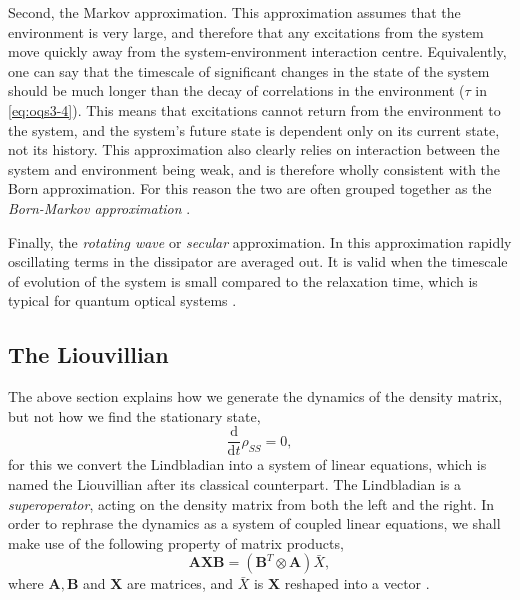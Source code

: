 Second, the Markov approximation. This approximation assumes that the environment is very large, and therefore that any excitations from the system move quickly away from the system-environment interaction centre. Equivalently, one can say that the timescale of significant changes in the state of the system should be much longer than the decay of correlations in the environment (\(\tau\) in \cref{eq:oqs3-4}). This means that excitations cannot return from the environment to the system, and the system's future state is dependent only on its current state, not its history. This approximation also clearly relies on interaction between the system and environment being weak, and is therefore wholly consistent with the Born approximation. For this reason the two are often grouped together as the \emph{Born-Markov approximation} \cite{Hartmann_BM,BP_BMS}.

Finally, the \emph{rotating wave} or \emph{secular} approximation. In this approximation rapidly oscillating terms in the dissipator are averaged out. It is valid when the timescale of evolution of the system is small compared to the relaxation time, which is typical for quantum optical systems \cite{BP_BMS}.

\subsection{The Liouvillian}
The above section explains how we generate the dynamics of the density matrix, but not how we find the stationary state,
\begin{equation}
	\frac{\mathrm{d}}{\mathrm{d}t}\rho_{SS} = 0,
	\label{eq:oqs4-1}
\end{equation}
for this we convert the Lindbladian into a system of linear equations, which is named the Liouvillian after its classical counterpart. The Lindbladian is a \emph{superoperator}, acting on the density matrix from both the left and the right. In order to rephrase the dynamics as a system of coupled linear equations, we shall make use of the following property of matrix products,
\begin{equation}
	 \mathbf{A}\mathbf{X}\mathbf{B} = \left(\mathbf{B}^{T} \otimes \mathbf{A}\right)\bar{X},
	 \label{eq:oqs4-2}
\end{equation}
 where \(\mathbf{A}, \mathbf{B}\) and \(\mathbf{X}\) are matrices, and \(\bar{X}\) is \(\mathbf{X}\) reshaped into a vector \cite{Macedo2013,Roth1934}.

